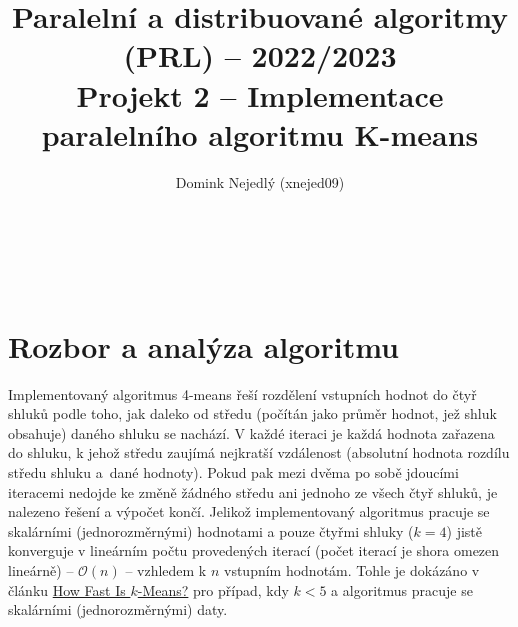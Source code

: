 \documentclass[a4paper]{article}
\title{Paralelní a distribuované algoritmy (PRL) – 2022/2023\\[0.4ex] \large Projekt 2 -- Implementace paralelního algoritmu K-means}
\author{Domink Nejedlý (xnejed09)}
\makeatletter
\newcommand{\bigO}[1]{\mathcal{O}(#1)}
\renewcommand\maketitle{
{\raggedright
\begin{center}
{\Large \bfseries \@title}\\[2ex]
{\@author}\\[8ex] 
\end{center}}}
\makeatother
\begin{document}
\maketitle



\section{Rozbor a analýza algoritmu}



Implementovaný algoritmus 4-means řeší rozdělení vstupních hodnot do čtyř shluků podle toho, jak daleko od středu (počítán jako průměr hodnot, jež shluk obsahuje) daného shluku se nachází. V každé iteraci je každá hodnota zařazena do shluku, k jehož středu zaujímá nejkratší vzdálenost (absolutní hodnota rozdílu středu shluku a~dané hodnoty). Pokud pak mezi dvěma po sobě jdoucími iteracemi nedojde ke změně žádného středu ani jednoho ze všech čtyř shluků, je nalezeno řešení a výpočet končí. Jelikož implementovaný algoritmus pracuje se skalárními (jednorozměrnými) hodnotami a pouze čtyřmi shluky ($k = 4$) jistě konverguje v lineárním počtu provedených iterací (počet iterací je shora omezen lineárně) -- $\bigO{n}$ -- vzhledem k $n$ vstupním hodnotám. Tohle je dokázáno v článku \href{https://link.springer.com/chapter/10.1007/978-3-540-45167-9_56}{How Fast Is $k$-Means?} pro případ, kdy $k < 5$ a algoritmus pracuje se skalárními (jednorozměrnými) daty.
\end{document}
